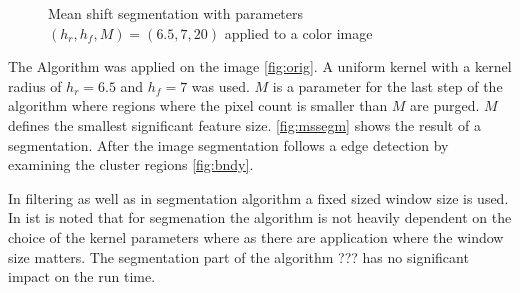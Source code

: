 \begin{figure}[ht]
\centering
{}%
%
%

\caption{Mean shift segmentation with parameters $(h_r, h_f, M) = (6.5, 7, 20)$
		 applied to a color image}
\label{fig:mssegm}
\end{figure}


The Algorithm was applied on the image \autoref{fig:orig}. A uniform kernel with
a kernel radius of $h_r = 6.5$ and $h_f = 7$ was used. $M$ is a parameter for
the last step of the algorithm where regions where the pixel count is smaller
than $M$ are purged. $M$ defines the smallest significant feature size.
\autoref{fig:mssegm} shows the result of a segmentation. After the image
segmentation follows a edge detection by examining the cluster regions
\autoref{fig:bndy}.

In filtering as well as in segmentation algorithm a fixed sized window size is 
used. In \citeauthor{citeulike:462300} \citep{citeulike:462300} ist is noted
that for segmenation the algorithm is not heavily dependent on the choice of the
kernel parameters where as there are application where the window size matters. 
The segmentation part of the algorithm ??? has no significant impact on the 
run time. 
